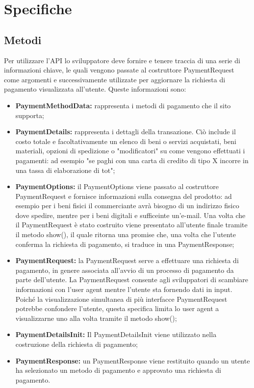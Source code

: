 \documentclass[11pt ,a4paper , twoside , openright ]{article}
\begin{document}
	\section{Specifiche}
	\subsection{Metodi}
	Per utilizzare l'API lo sviluppatore deve fornire e tenere traccia di una serie di informazioni chiave, le quali vengono passate al costruttore PaymentRequest come argomenti e successivamente utilizzate per aggiornare la richiesta di pagamento visualizzata all'utente. Queste informazioni sono:
	\begin{itemize}
	\item \textbf{PaymentMethodData:} rappresenta i metodi di pagamento che il sito supporta;
	\item \textbf{PaymentDetails:} rappresenta i dettagli della transazione. Ciò include il costo totale e facoltativamente un elenco di beni o servizi acquistati, beni materiali, opzioni di spedizione o "modificatori" su come vengono effettuati i pagamenti: ad esempio "se paghi con una carta di credito di tipo X incorre in una tassa di elaborazione di tot";
	\item \textbf{PaymentOptions:} il PaymentOptions viene passato al costruttore PaymentRequest e fornisce informazioni sulla consegna del prodotto: ad esempio per i beni fisici il commerciante avrà bisogno di un indirizzo fisico dove spedire, mentre per i beni digitali e sufficeinte un'e-mail. Una volta che il PaymentRequest è stato costruito viene presentato all'utente finale tramite il metodo show(), il quale ritorna una promise che, una volta che l'utente conferma la richiesta di pagamento, si traduce in una PaymentResponse;
	\item \textbf{PaymentRequest:} la PaymentRequest serve a effettuare una richiesta di pagamento, in genere associata all'avvio di un processo di pagamento da parte dell'utente. La PaymentRequest consente agli sviluppatori di scambiare informazioni con l'user agent mentre l'utente sta fornendo dati in input. Poiché la visualizzazione simultanea di più interfacce PaymentRequest potrebbe confondere l'utente, questa specifica limita lo user agent a visualizzarne uno alla volta tramite il metodo show();
	\item \textbf{PaymentDetailsInit:} Il PaymentDetailsInit viene utilizzato nella costruzione della richiesta di pagamento;
	\item \textbf{PaymentResponse:} un PaymentResponse viene restituito quando un utente ha selezionato un metodo di pagamento e approvato una richiesta di pagamento.
	\end{itemize}
\end{document}
